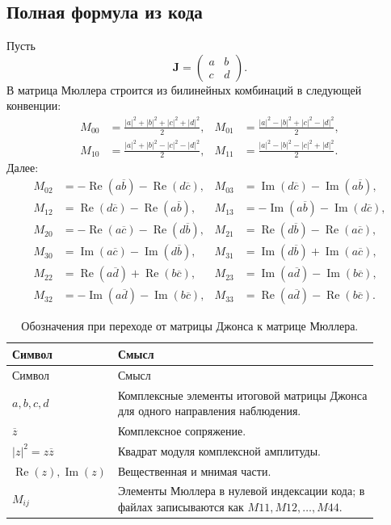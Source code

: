 \documentclass[11pt,a4paper]{article}
\newcommand{\code}[1]{\texttt{\small\detokenize{#1}}}
\newcommand{\matr}[1]{\symbf{#1}}
\newcommand{\Real}{\operatorname{Re}}
\newcommand{\Imag}{\operatorname{Im}}
\newcommand{\conj}[1]{\overline{#1}}
\begin{document}
\subsection{Полная формула из кода}

Пусть
\[
  \matr J=
  \begin{pmatrix}
  a&b\\c&d
  \end{pmatrix}.
\]
В \code{src/math/Mueller.cpp} матрица Мюллера строится из билинейных
комбинаций в следующей конвенции:
\[
\begin{aligned}
M_{00}&=\frac{|a|^2+|b|^2+|c|^2+|d|^2}{2},&
M_{01}&=\frac{|a|^2-|b|^2+|c|^2-|d|^2}{2},\\
M_{10}&=\frac{|a|^2+|b|^2-|c|^2-|d|^2}{2},&
M_{11}&=\frac{|a|^2-|b|^2-|c|^2+|d|^2}{2}.
\end{aligned}
\]
Далее:
\[
\begin{aligned}
M_{02}&=-\Real(a\conj b)-\Real(d\conj c),&
M_{03}&=\Imag(d\conj c)-\Imag(a\conj b),\\
M_{12}&=\Real(d\conj c)-\Real(a\conj b),&
M_{13}&=-\Imag(a\conj b)-\Imag(d\conj c),\\
M_{20}&=-\Real(a\conj c)-\Real(d\conj b),&
M_{21}&=\Real(d\conj b)-\Real(a\conj c),\\
M_{30}&=\Imag(a\conj c)-\Imag(d\conj b),&
M_{31}&=\Imag(d\conj b)+\Imag(a\conj c),\\
M_{22}&=\Real(a\conj d)+\Real(b\conj c),&
M_{23}&=\Imag(a\conj d)-\Imag(b\conj c),\\
M_{32}&=-\Imag(a\conj d)-\Imag(b\conj c),&
M_{33}&=\Real(a\conj d)-\Real(b\conj c).
\end{aligned}
\]

\begin{longtable}{L{0.18\linewidth} L{0.72\linewidth}}
\caption{Обозначения при переходе от матрицы Джонса к матрице Мюллера.}\\
\toprule
Символ & Смысл \\
\midrule
\endfirsthead
\toprule
Символ & Смысл \\
\midrule
\endhead
$a,b,c,d$ & Комплексные элементы итоговой матрицы Джонса для одного направления наблюдения. \\
$\conj z$ & Комплексное сопряжение. \\
$|z|^2=z\conj z$ & Квадрат модуля комплексной амплитуды. \\
$\Real(z),\Imag(z)$ & Вещественная и мнимая части. \\
$M_{ij}$ & Элементы Мюллера в нулевой индексации кода; в файлах записываются как $M11,M12,\ldots,M44$. \\
\bottomrule
\end{longtable}
\end{document}
